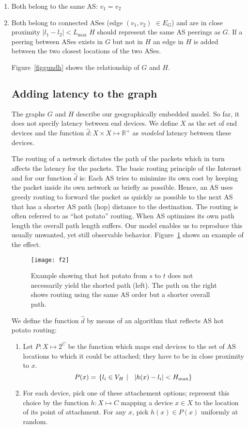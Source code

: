 \documentclass{sig-alternate-10pt}
\begin{document}
\begin{enumerate}
\item\label{con1} Both belong to the same AS: $v_1 = v_2$
\item\label{con2} Both belong to connected ASes (edge $(v_1,v_2)$ $\in E_G$) 
 and are in close proximity $|l_1 - l_2| < L_{\max}$
$H$ should represent the same AS peerings as $G$. If a peering between ASes exists in $G$  but not in $H$ an edge in $H$ is added between the two closest locations of the two ASes.


Figure~\ref{figgundh} shows the relationship  of $G$ and
$H$. 
\subsection{Adding latency to the graph}
\label{sec:adding-latency-graph}

The graphs $G$ and $H$ describe our geographically embedded model. So far, it does not specify latency between end devices.  We define $X$ as the set of end devices and the function $\hat d: X \times X \mapsto \mathbb{R}^+$ as \emph{modeled} latency between these devices.

The routing of a network dictates the path of the packets which in turn affects the latency for the packets. The basic routing principle of the Internet and for our function $\hat d$ is:  Each AS tries to minimize its own cost by keeping the packet inside its own network as briefly as possible. Hence, an AS uses greedy routing to forward the packet as quickly as possible to the next AS that has a shorter AS path (hop) distance to the destination. The routing is often referred to as ``hot potato'' routing. When AS optimizes its own path length the overall path length suffers. Our model enables us to reproduce this usually unwanted, yet still observable behavior. Figure~\ref{greedyrouting} shows an example of the effect.

\begin{figure}
\texttt{[image: f2]}
\caption{Example showing that hot potato from $s$ to $t$ does not necessarily yield the shorted path (left). The path on the right shows routing using the same AS order but a shorter overall path. }\label{greedyrouting}
\end{figure}


We define the function $\hat d$ by means of an algorithm that reflects AS hot potato routing:\begin{enumerate}
\item \label{item:pick-candidate-locations} Let 
$P:X \mapsto 2^C$ be the function which maps end devices to the set of AS locations to which it could be attached; they have to be in close proximity to $x$. 
\[P(x)= \left.\left\{ l_{i} \in V_H \right.\huge\mid\ | h(x) -  l_{i}|  < H_{\max}\right\} \]
\item \label{item:pick-location} For each device, pick one of these attachement options; represent this choice by the function $h: X \mapsto C$ mapping a device $x \in X$ to the location of its point of attachment. 
For any $x$, pick $h(x) \in P(x)$ uniformly at random. 


\end{enumerate}
\end{enumerate}
\end{document}
